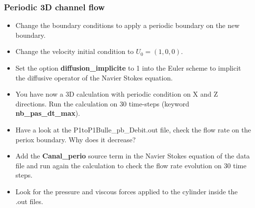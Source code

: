 \documentclass[10pt]{beamer}
\begin{document}
\begin{frame}
\frametitle{Periodic 3D channel flow}
\begin{block}{}

\begin{itemize}
\item Change the boundary conditions to apply a periodic boundary on the new boundary. 

\item Change the velocity initial condition to $U_0=(1,0,0)$. 

\item Set the option \textbf{diffusion\_implicite} to 1 into the Euler scheme to implicit the diffusive operator of the Navier Stokes equation.

\item You have now a 3D calculation with periodic condition on X and Z directions. Run the calculation on 30 time-steps (keyword \textbf{nb\_pas\_dt\_max}).

\item Have a look at the P1toP1Bulle\_pb\_Debit.out file, check the flow rate on the periox boundary. Why does it decrease?

\item Add the \textbf{Canal\_perio} source term in the Navier Stokes equation of the data file and run again the calculation to check the flow rate evolution on 30 time steps. 

\item Look for the pressure and viscous forces applied to the cylinder inside the .out files.
\end{itemize}

\end{block}
\end{frame}
\end{document}
